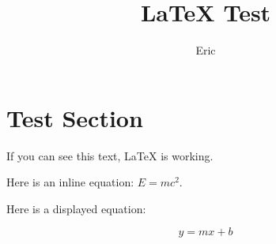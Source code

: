 \documentclass{article}
\title{LaTeX Test}
\author{Eric}
\date{}
\begin{document}
\maketitle

\section{Test Section}

If you can see this text, LaTeX is working.

Here is an inline equation: $E = mc^2$.

Here is a displayed equation:

\[
y = mx + b
\]
\end{document}
